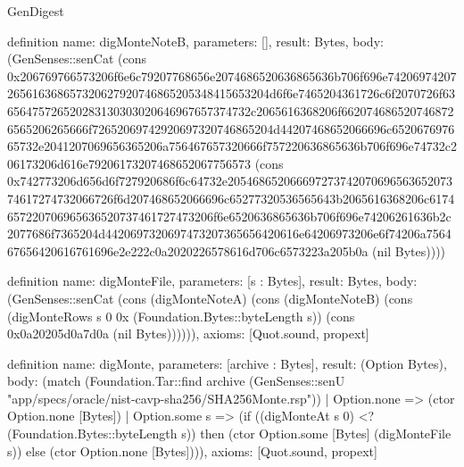 \begin{lexlean}{GenDigest}
\begin{semanticmodule}
definition{
  name: digMonteNoteB,
  parameters: [],
  result: Bytes,
  body: (GenSenses::senCat (cons 0x206769766573206f6e6c79207768656e2074686520636865636b706f696e74206974207265616368657320627920746865205348415653204d6f6e7465204361726c6f2070726f63656475726520283130303020646967657374732c2065616368206f6620746865207468726565206265666f72652069742920697320746865204d44207468652066696c652067697665732e2041207069656365206a756467657320666f757220636865636b706f696e74732c206173206d616e79206173207468652067756573 (cons 0x742773206d656d6f727920686f6c64732e20546865206669727374207069656365207374617274732066726f6d207468652066696c65277320536565643b2065616368206c6174657220706965636520737461727473206f6e6520636865636b706f696e74206261636b2c2077686f7365204d4420697320697473207365656420616e64206973206e6f74206a756467656420616761696e2e222c0a2020226578616d706c6573223a205b0a (nil Bytes))))
}

definition{
  name: digMonteFile,
  parameters: [s : Bytes],
  result: Bytes,
  body: (GenSenses::senCat (cons (digMonteNoteA) (cons (digMonteNoteB) (cons (digMonteRows s 0 0x (Foundation.Bytes::byteLength s)) (cons 0x0a20205d0a7d0a (nil Bytes)))))),
  axioms: [Quot.sound, propext]
}

definition{
  name: digMonte,
  parameters: [archive : Bytes],
  result: (Option Bytes),
  body: (match (Foundation.Tar::find archive (GenSenses::senU "app/specs/oracle/nist-cavp-sha256/SHA256Monte.rsp"))
    | Option.none => (ctor Option.none [Bytes])
    | Option.some s => (if ((digMonteAt s 0) <? (Foundation.Bytes::byteLength s)) then (ctor Option.some [Bytes] (digMonteFile s)) else (ctor Option.none [Bytes]))),
  axioms: [Quot.sound, propext]
}
\end{semanticmodule}
\end{lexlean}

